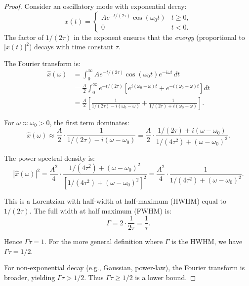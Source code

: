 \documentclass[twocolumn,10pt,a4paper]{article}
\theoremstyle{remark}
\begin{document}
\begin{proof}
Consider an oscillatory mode with exponential decay:
\begin{equation}
x(t) = \begin{cases}
A e^{-t/(2\tau)} \cos(\omega_0 t) & t \geq 0, \\
0 & t < 0.
\end{cases}
\end{equation}
The factor of $1/(2\tau)$ in the exponent ensures that the \emph{energy} (proportional to $|x(t)|^2$) decays with time constant $\tau$.

The Fourier transform is:
\begin{align}
\hat{x}(\omega) &= \int_0^\infty A e^{-t/(2\tau)} \cos(\omega_0 t) e^{-i\omega t} \, dt \\
&= \frac{A}{2} \int_0^\infty e^{-t/(2\tau)} \left[ e^{i(\omega_0 - \omega)t} + e^{-i(\omega_0 + \omega)t} \right] dt \\
&= \frac{A}{2} \left[ \frac{1}{1/(2\tau) - i(\omega_0 - \omega)} + \frac{1}{1/(2\tau) + i(\omega_0 + \omega)} \right].
\end{align}

For $\omega \approx \omega_0 > 0$, the first term dominates:
\begin{equation}
\hat{x}(\omega) \approx \frac{A}{2} \cdot \frac{1}{1/(2\tau) - i(\omega - \omega_0)} = \frac{A}{2} \cdot \frac{1/(2\tau) + i(\omega - \omega_0)}{1/(4\tau^2) + (\omega - \omega_0)^2}.
\end{equation}

The power spectral density is:
\begin{equation}
|\hat{x}(\omega)|^2 = \frac{A^2}{4} \cdot \frac{1/(4\tau^2) + (\omega - \omega_0)^2}{[1/(4\tau^2) + (\omega - \omega_0)^2]^2} = \frac{A^2}{4} \cdot \frac{1}{1/(4\tau^2) + (\omega - \omega_0)^2}.
\end{equation}

This is a Lorentzian with half-width at half-maximum (HWHM) equal to $1/(2\tau)$. The full width at half maximum (FWHM) is:
\begin{equation}
\Gamma = 2 \cdot \frac{1}{2\tau} = \frac{1}{\tau}.
\end{equation}

Hence $\Gamma \tau = 1$. For the more general definition where $\Gamma$ is the HWHM, we have $\Gamma \tau = 1/2$.

For non-exponential decay (e.g., Gaussian, power-law), the Fourier transform is broader, yielding $\Gamma \tau > 1/2$. Thus $\Gamma \tau \geq 1/2$ is a lower bound.
\end{proof}
\end{document}
